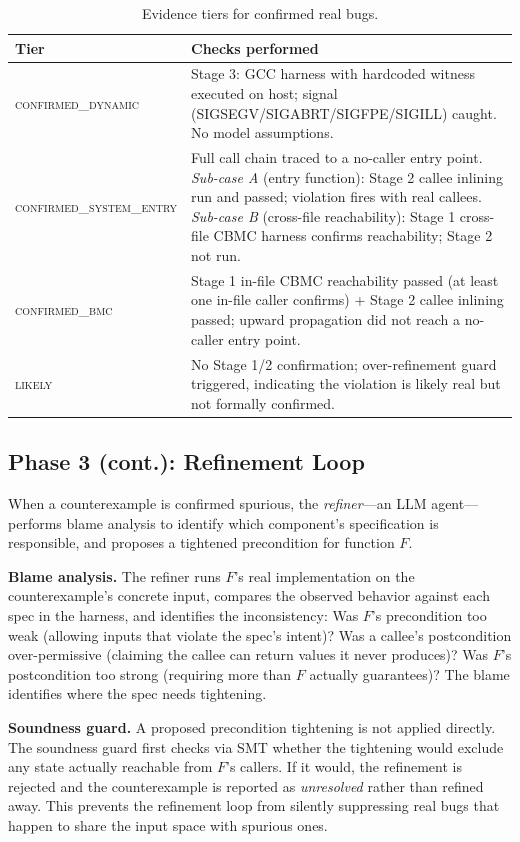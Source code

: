 \documentclass[11pt,a4paper]{article}
\newcommand{\dynconf}{\textsc{confirmed\_dynamic}\xspace}
\newcommand{\sysconf}{\textsc{confirmed\_system\_entry}\xspace}
\newcommand{\bmcconf}{\textsc{confirmed\_bmc}\xspace}
\newcommand{\likelyconf}{\textsc{likely}\xspace}
\begin{document}
\begin{table}[t]
\caption{Evidence tiers for confirmed real bugs.}
\label{tab:tiers}
\small
\begin{tabular}{p{2.6cm}p{4.9cm}}
\toprule
\textbf{Tier} & \textbf{Checks performed} \\
\midrule
\dynconf
  & Stage 3: GCC harness with hardcoded witness executed on host; signal
    (SIGSEGV/SIGABRT/SIGFPE/SIGILL) caught. No model assumptions. \\[4pt]
\sysconf
  & Full call chain traced to a no-caller entry point.
    \emph{Sub-case A} (entry function): Stage 2 callee inlining run and
    passed; violation fires with real callees.
    \emph{Sub-case B} (cross-file reachability): Stage 1 cross-file CBMC
    harness confirms reachability; Stage 2 not run. \\[4pt]
\bmcconf
  & Stage 1 in-file CBMC reachability passed (at least one in-file caller
    confirms) + Stage 2 callee inlining passed; upward propagation did not
    reach a no-caller entry point. \\[4pt]
\likelyconf
  & No Stage 1/2 confirmation; over-refinement guard triggered, indicating
    the violation is likely real but not formally confirmed. \\
\bottomrule
\end{tabular}
\end{table}

\subsection{Phase 3 (cont.): Refinement Loop}
\label{sec:refinement}

When a counterexample is confirmed spurious, the \emph{refiner}---an LLM
agent---performs blame analysis to identify which component's specification is
responsible, and proposes a tightened precondition for function $F$.

\smallskip\noindent\textbf{Blame analysis.}
The refiner runs $F$'s real implementation on the counterexample's concrete
input, compares the observed behavior against each spec in the harness, and
identifies the inconsistency: Was $F$'s precondition too weak (allowing
inputs that violate the spec's intent)? Was a callee's postcondition
over-permissive (claiming the callee can return values it never produces)?
Was $F$'s postcondition too strong (requiring more than $F$ actually
guarantees)? The blame identifies where the spec needs tightening.

\smallskip\noindent\textbf{Soundness guard.}
A proposed precondition tightening is not applied directly. The soundness
guard first checks via SMT whether the tightening would exclude any state
actually reachable from $F$'s callers. If it would, the refinement is
rejected and the counterexample is reported as \emph{unresolved} rather than
refined away. This prevents the refinement loop from silently suppressing
real bugs that happen to share the input space with spurious ones.
\end{document}
